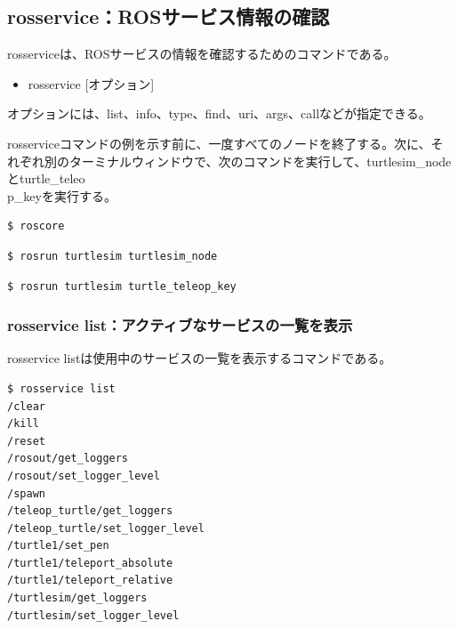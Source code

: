 \subsection{rosservice：ROSサービス情報の確認}

rosserviceは、ROSサービスの情報を確認するためのコマンドである。\\

\begin{itemize}
\item rosservice [オプション]\\
\end{itemize}

オプションには、list、info、type、find、uri、args、callなどが指定できる。

rosserviceコマンドの例を示す前に、一度すべてのノードを終了する。次に、それぞれ別のターミナルウィンドウで、次のコマンドを実行して、turtlesim\_nodeとturtle\_teleo\\p\_keyを実行する。

\begin{lstlisting}[language=ROS]
$ roscore
\end{lstlisting}

\begin{lstlisting}[language=ROS]
$ rosrun turtlesim turtlesim_node
\end{lstlisting}

\begin{lstlisting}[language=ROS]
$ rosrun turtlesim turtle_teleop_key
\end{lstlisting}

\subsubsection{rosservice list：アクティブなサービスの一覧を表示}

rosservice listは使用中のサービスの一覧を表示するコマンドである。

\begin{lstlisting}[language=ROS]
$ rosservice list
/clear
/kill
/reset
/rosout/get_loggers
/rosout/set_logger_level
/spawn
/teleop_turtle/get_loggers
/teleop_turtle/set_logger_level
/turtle1/set_pen
/turtle1/teleport_absolute
/turtle1/teleport_relative
/turtlesim/get_loggers
/turtlesim/set_logger_level
\end{lstlisting}

